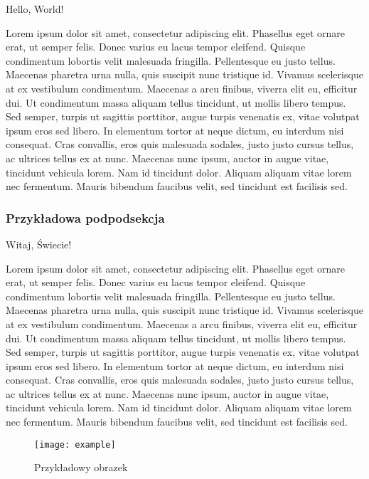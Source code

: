 \documentclass[10pt,a4paper,titlepage,twocolumn]{article}
\begin{document}
Hello, World!

Lorem ipsum dolor sit amet, consectetur adipiscing elit. Phasellus eget ornare
erat, ut semper felis. Donec varius eu lacus tempor eleifend. Quisque
condimentum lobortis velit malesuada fringilla. Pellentesque eu justo tellus.
Maecenas pharetra urna nulla, quis suscipit nunc tristique id. Vivamus
scelerisque at ex vestibulum condimentum. Maecenas a arcu finibus, viverra elit
eu, efficitur dui. Ut condimentum massa aliquam tellus tincidunt, ut mollis
libero tempus. Sed semper, turpis ut sagittis porttitor, augue turpis venenatis
ex, vitae volutpat ipsum eros sed libero. In elementum tortor at neque dictum,
eu interdum nisi consequat. Cras convallis, eros quis malesuada sodales, justo
justo cursus tellus, ac ultrices tellus ex at nunc. Maecenas nunc ipsum, auctor
in augue vitae, tincidunt vehicula lorem. Nam id tincidunt dolor. Aliquam
aliquam vitae lorem nec fermentum. Mauris bibendum faucibus velit, sed tincidunt
est facilisis sed.

\subsubsection{Przykładowa podpodsekcja}

Witaj, Świecie!

Lorem ipsum dolor sit amet, consectetur adipiscing elit. Phasellus eget ornare
erat, ut semper felis. Donec varius eu lacus tempor eleifend. Quisque
condimentum lobortis velit malesuada fringilla. Pellentesque eu justo tellus.
Maecenas pharetra urna nulla, quis suscipit nunc tristique id. Vivamus
scelerisque at ex vestibulum condimentum. Maecenas a arcu finibus, viverra elit
eu, efficitur dui. Ut condimentum massa aliquam tellus tincidunt, ut mollis
libero tempus. Sed semper, turpis ut sagittis porttitor, augue turpis venenatis
ex, vitae volutpat ipsum eros sed libero. In elementum tortor at neque dictum,
eu interdum nisi consequat. Cras convallis, eros quis malesuada sodales, justo
justo cursus tellus, ac ultrices tellus ex at nunc. Maecenas nunc ipsum, auctor
in augue vitae, tincidunt vehicula lorem. Nam id tincidunt dolor. Aliquam
aliquam vitae lorem nec fermentum. Mauris bibendum faucibus velit, sed tincidunt
est facilisis sed.

\begin{figure}[!htp]
    \centering
    \texttt{[image: example]}
    \caption{Przykładowy obrazek}
\end{figure}
\end{document}
